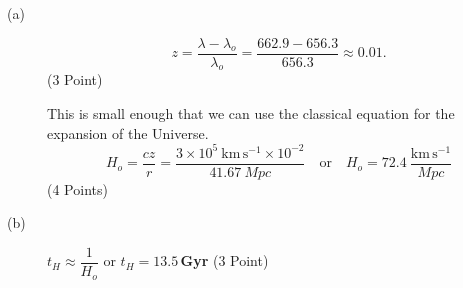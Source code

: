\begin{description}
\item[(a)]
\[
z = \frac{\lambda - \lambda_o}{\lambda_o}
= \frac{662.9 - 656.3}{656.3} \approx 0.01.
\]
\hfill(3 Point)

This is small enough that we can use the classical equation for the expansion
of the Universe.
\[
H_o = \frac{cz}{r}
= \frac{3\times10^{5}\ \mathrm{km\,s^{-1}} \times 10^{-2}}{41.67\ Mpc}
\quad\text{or}\quad
H_o = 72.4\ \frac{\mathrm{km\,s^{-1}}}{Mpc}
\]
\hfill(4 Points)

\item[(b)] $t_H \approx \dfrac{1}{H_o}$ or $t_H = 13.5$\,\textbf{Gyr}
\hfill(3 Point)
\end{description}
